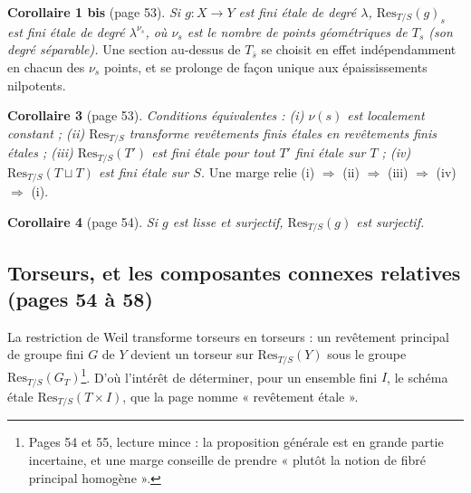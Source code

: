 \documentclass[11pt,a4paper]{article}
\begin{document}
\textbf{Corollaire 1 bis} (page 53). \emph{Si $g : X \to Y$ est fini étale de
degré $\lambda$, $\mathrm{Res}_{T/S}(g)_s$ est fini étale de degré
$\lambda^{\nu_s}$, où $\nu_s$ est le nombre de points géométriques de $T_s$ (son
degré séparable).} Une section au-dessus de $T_{\bar s}$ se choisit en effet
indépendamment en chacun des $\nu_s$ points, et se prolonge de façon unique aux
épaississements nilpotents.

\textbf{Corollaire 3} (page 53). \emph{Conditions équivalentes : (i) $\nu(s)$ est
localement constant ; (ii) $\mathrm{Res}_{T/S}$ transforme revêtements finis
étales en revêtements finis étales ; (iii) $\mathrm{Res}_{T/S}(T')$ est fini étale
pour tout $T'$ fini étale sur $T$ ; (iv) $\mathrm{Res}_{T/S}(T \sqcup T)$ est fini
étale sur $S$.} Une marge relie (i) $\Rightarrow$ (ii) $\Rightarrow$ (iii)
$\Rightarrow$ (iv) $\Rightarrow$ (i).

\textbf{Corollaire 4} (page 54). \emph{Si $g$ est lisse et surjectif,
$\mathrm{Res}_{T/S}(g)$ est surjectif.}

\subsection*{Torseurs, et les composantes connexes relatives (pages 54 à 58)}

La restriction de Weil transforme torseurs en torseurs : un revêtement
principal de groupe fini $G$ de $Y$ devient un torseur sur
$\mathrm{Res}_{T/S}(Y)$ sous le groupe $\mathrm{Res}_{T/S}(G_T)$\footnote{Pages 54 et
55, lecture mince : la proposition générale est en grande partie incertaine,
et une marge conseille de prendre « plutôt la notion de fibré principal
homogène ».}. D'où l'intérêt de déterminer, pour un ensemble fini $I$, le
schéma étale $\mathrm{Res}_{T/S}(T \times I)$, que la page nomme
« revêtement étale ».
\end{document}
